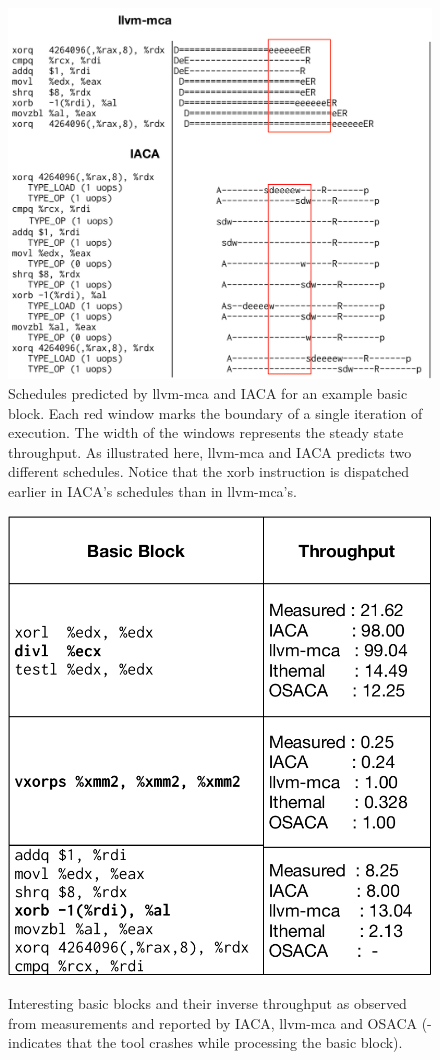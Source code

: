 \begin{figure}[htbp!]
    \includegraphics[width=0.95\columnwidth]{figures/scheduling.pdf}
    \caption{Schedules predicted by llvm-mca and IACA for an example basic block.
    Each red window marks the boundary of a single iteration of execution.
    The width of the windows represents the steady state throughput.
    As illustrated here, llvm-mca and IACA predicts two different schedules.
    Notice that the xorb instruction is dispatched earlier in IACA's schedules than in llvm-mca's. 
    }
    \label{tab:case-study}
\end{figure}

\begin{figure}[htbp!]
    \begin{center}
    \includegraphics[width=0.7\columnwidth]{figures/interesting-examples.pdf}
    \caption{Interesting basic blocks and their inverse throughput as observed from measurements and reported by IACA, llvm-mca and OSACA (- indicates that the tool crashes while processing the basic block).}
    \label{tab:case-study}
    \label{fig:schedule}
    \end{center}
\end{figure}

